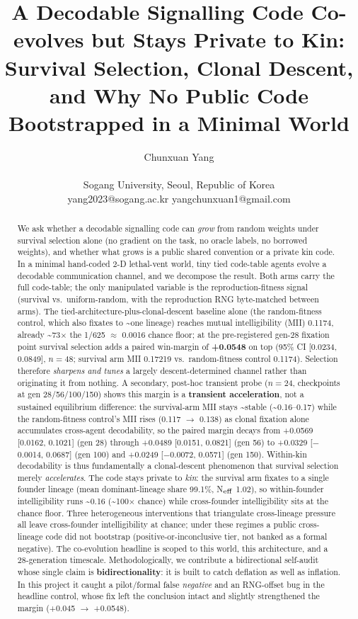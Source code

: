 \documentclass[12pt,letterpaper]{article}
\title{A Decodable Signalling Code Co-evolves but Stays Private to Kin:\\
Survival Selection, Clonal Descent, and Why No Public Code\\
Bootstrapped in a Minimal World}
\author{
    Chunxuan Yang \\
    \mbox{}\\
    Sogang University, Seoul, Republic of Korea \\
    yang2023@sogang.ac.kr \quad yangchunxuan1@gmail.com
}
\begin{document}
\maketitle

\begin{abstract}
We ask whether a decodable signalling code can \emph{grow} from random weights under
survival selection alone (no gradient on the task, no oracle labels, no borrowed
weights), and whether what grows is a public shared convention or a private kin code.
In a minimal hand-coded 2-D lethal-vent world, tiny tied code-table agents evolve a
decodable communication channel, and we decompose the result. Both arms carry the full
code-table; the only manipulated variable is the reproduction-fitness signal (survival
vs.\ uniform-random, with the reproduction RNG byte-matched between arms). The
tied-architecture-plus-clonal-descent baseline alone (the random-fitness control, which
also fixates to \textasciitilde{}one lineage) reaches mutual intelligibility (MII) 0.1174,
already \textasciitilde{}73$\times$ the 1/625 $\approx$ 0.0016 chance floor; at the
pre-registered gen-28 fixation point survival selection adds a paired win-margin of
\textbf{+0.0548} on top (95\% CI [0.0234, 0.0849], $n{=}48$; survival arm MII 0.17219
vs.\ random-fitness control 0.1174). Selection therefore \emph{sharpens and tunes} a
largely descent-determined channel rather than originating it from nothing. A secondary,
post-hoc transient probe ($n{=}24$, checkpoints at gen 28/56/100/150) shows this margin
is a \textbf{transient acceleration}, not a sustained equilibrium difference: the
survival-arm MII stays \textasciitilde{}stable (\textasciitilde{}0.16--0.17) while the
random-fitness control's MII rises (0.117 $\to$ 0.138) as clonal fixation alone
accumulates cross-agent decodability, so the paired margin decays from
+0.0569 [0.0162, 0.1021] (gen 28) through +0.0489 [0.0151, 0.0821] (gen 56)
to +0.0329 [$-$0.0014, 0.0687] (gen 100) and +0.0249 [$-$0.0072, 0.0571] (gen 150).
Within-kin decodability is thus fundamentally a clonal-descent phenomenon that survival
selection merely \emph{accelerates}. The code stays private to \emph{kin}: the survival
arm fixates to a single founder lineage (mean dominant-lineage share 99.1\%, N$_{\rm eff}$ 1.02),
so within-founder intelligibility runs \textasciitilde{}0.16 (\textasciitilde{}100$\times$
chance) while cross-founder intelligibility sits at the chance floor. Three heterogeneous
interventions that triangulate cross-lineage pressure all leave cross-founder
intelligibility at chance; under these regimes a public cross-lineage code did not
bootstrap (positive-or-inconclusive tier, not banked as a formal negative). The
co-evolution headline is scoped to this world, this architecture, and a 28-generation
timescale. Methodologically, we contribute a bidirectional self-audit whose single claim
is \textbf{bidirectionality}: it is built to catch deflation as well as inflation. In this
project it caught a pilot/formal false \emph{negative} and an RNG-offset bug in the headline
control, whose fix left the conclusion intact and slightly strengthened the margin
(+0.045 $\to$ +0.0548).
\end{abstract}
\end{document}
